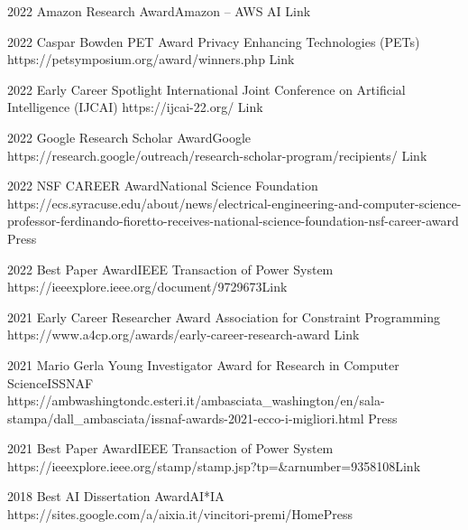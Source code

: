 \documentclass[localFont,alternative]{documentMETADATA}
\begin{document}
\begin{awards}
	\awardentry
	{2022}
	{Amazon Research Award}{Amazon -- AWS AI}
	{}
	{Link}

	\awardentry
	{2022}
	{Caspar Bowden PET Award}%
	{Privacy Enhancing Technologies (PETs)}
	{https://petsymposium.org/award/winners.php}
	{Link}

	\awardentry
	{2022}
	{Early Career Spotlight}%
	{International Joint Conference on Artificial Intelligence (IJCAI)}
	{https://ijcai-22.org/}
	{Link}

	\awardentry
	{2022}
	{Google Research Scholar Award}{Google}
	{https://research.google/outreach/research-scholar-program/recipients/}
	{Link}

	\awardentry
	{2022}
	{NSF CAREER Award}{National Science Foundation}
	{https://ecs.syracuse.edu/about/news/electrical-engineering-and-computer-science-professor-ferdinando-fioretto-receives-national-science-foundation-nsf-career-award}
	{Press}

	\awardentry
	{2022}
	{Best Paper Award}{IEEE Transaction of Power System}
	{https://ieeexplore.ieee.org/document/9729673}{Link}

	\awardentry
	{2021}
	{Early Career Researcher Award}
	{Association for Constraint Programming}
	{https://www.a4cp.org/awards/early-career-research-award}
	{Link}

	\awardentry
	{2021}
	{Mario Gerla Young Investigator Award for Research in Computer Science}{ISSNAF}
	{https://ambwashingtondc.esteri.it/ambasciata_washington/en/sala-stampa/dall_ambasciata/issnaf-awards-2021-ecco-i-migliori.html}
	{Press}

		
	\awardentry
	{2021}
	{Best Paper Award}{IEEE Transaction of Power System}
	{https://ieeexplore.ieee.org/stamp/stamp.jsp?tp=\&arnumber=9358108}{Link}

	\awardentry
	{2018}
	{Best AI Dissertation Award}{AI*IA} %
	{https://sites.google.com/a/aixia.it/vincitori-premi/Home}{Press}


\end{awards}	
\end{document}
